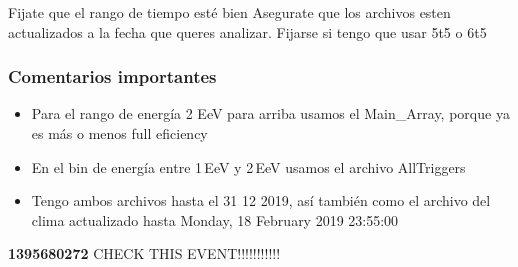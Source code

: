 \begin{itemize}
	\done Fijate que el rango de tiempo esté bien
	\done Asegurate que los archivos esten actualizados a la fecha que queres analizar.
	\done Fijarse si tengo que usar 5t5 o 6t5
\end{itemize}

\subsubsection*{Comentarios importantes}

\begin{itemize}
	\item Para el rango de energía 2 EeV para arriba usamos el  Main\_Array, porque ya es más o menos full eficiency
	\item En el bin de energía entre 1\,EeV y 2\,EeV usamos el archivo AllTriggers
	\item Tengo ambos archivos hasta el 31 12 2019, así también como el archivo del clima actualizado hasta  Monday, 18 February 2019 23:55:00
\end{itemize}



{\bf 1395680272} CHECK THIS EVENT!!!!!!!!!!!